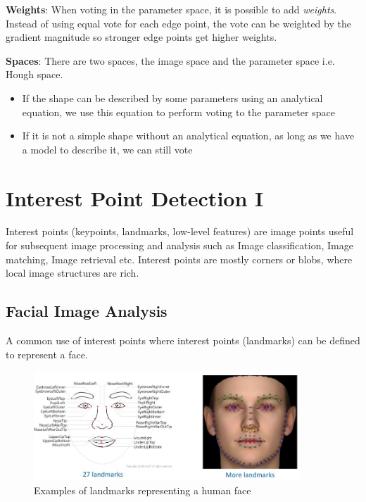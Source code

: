\documentclass{report}
\begin{document}
\textbf{Weights}: When voting in the parameter space, it is possible to add
\textit{weights}. Instead of using equal vote for each edge point, the vote can be weighted
by the gradient magnitude so stronger edge points get higher weights.

\textbf{Spaces}:  There are two spaces, the image space and the parameter space
i.e. Hough space.
\begin{itemize}
    \item If the shape can be described by some parameters using an analytical equation, we
    use this equation to perform voting to the parameter space
    \item If it is not a simple shape without an analytical equation, as long as we have a model
    to describe it, we can still vote
\end{itemize}

\chapter{Interest Point Detection I}

Interest points (keypoints, landmarks, low-level features) are image points
useful for subsequent image processing and analysis such as Image
classification, Image matching, Image retrieval etc. Interest points are mostly
corners or blobs, where local image structures are rich. 

\section{Facial Image Analysis}

A common use of interest points where interest points (landmarks) can be defined
to represent a face.
\begin{figure}[h]
    \centering
    \includegraphics[width=10cm]{Face interest points.JPG}
    \caption{Examples of landmarks representing a human face}
\end{figure}
\end{document}
